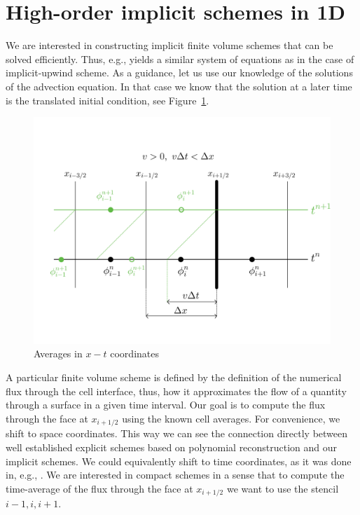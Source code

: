 \documentclass[../thesis.tex]{subfiles}
\begin{document}
\graphicspath{ {./img/}{./tab/} }
\section[]{High-order implicit schemes in 1D}
We are interested in constructing implicit finite volume schemes that can be solved efficiently. Thus, e.g., yields a similar system of equations as in the case of implicit-upwind scheme.
As a guidance, let us use our knowledge of the solutions of the advection equation. In that case we know that the solution at a later time is the translated initial condition, see Figure~\ref{fig:characteristics-1d}.
\begin{figure}[H]
	\centering
	\includegraphics[width=\textwidth]{Characteristics-crop.pdf}
	\caption{Averages in \(x-t\) coordinates}
	\label{fig:characteristics-1d}
\end{figure}
A particular finite volume scheme is defined by the definition of the numerical flux through the cell interface, thus, how it approximates the flow of a quantity through a surface in a given time interval.
Our goal is to compute the flux through the face at \(x_{i+1/2}\) using the known cell averages.
For convenience, we shift to space coordinates.
This way we can see the connection directly between well established explicit schemes based on polynomial reconstruction \cite{1977_VanLeer,2002_LeVeque_BOOK} and our implicit schemes.
We could equivalently shift to time coordinates, as it was done in, e.g., \cite{2023_Barsukow,2022_Eimer}.
We are interested in compact schemes in a sense that to compute the time-average of the flux through the face at \(x_{i+1/2}\) we want to use the stencil \(i-1, i, i+1\).
\end{document}
